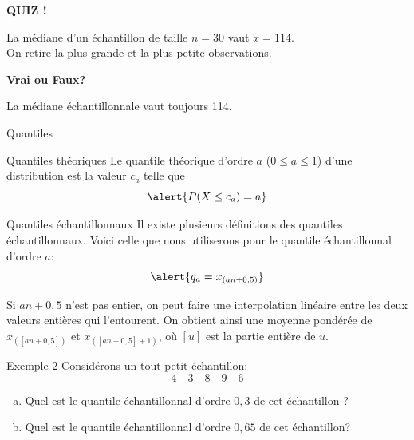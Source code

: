 \documentclass{BeamerTemplate}
\begin{document}
\begin{frame}[t]{ }

\centerline{\LARGE\bf \alert{QUIZ !}}
\bigskip

La médiane d'un échantillon de taille $n=30$ vaut $\widetilde x =114$. \\
On retire la plus grande et la plus petite observations.
\bigskip

{\bf Vrai ou Faux?}
\bigskip

La médiane échantillonnale vaut toujours 114.
\vspace{2cm}

\end{frame}
\begin{frame}[t]{Quantiles}
\vspace{-0.6cm}
\begin{Boite}{Quantiles théoriques}
Le quantile théorique d'ordre $a$ ($0\leq a\leq 1$) d'une distribution est la valeur $c_a$ telle que
$$\alert{P(X\le c_a)=a}$$
\end{Boite}

\begin{Boite}{Quantiles échantillonnaux}
Il existe plusieurs définitions des quantiles échantillonnaux. Voici celle que nous utiliserons pour le  quantile échantillonnal d'ordre $a$:
$$\alert{q_a=x_{(an+0,5)}}$$
\end{Boite}

\alert{Si $an+0,5$ n'est pas entier}, on peut faire une interpolation linéaire entre les deux valeurs entières qui l'entourent. On obtient ainsi une moyenne pondérée de $x_{([an+0,5])}$ et $x_{([an+0,5]+1)}$, o\`u $[u]$ est la partie entière de $u$.

\end{frame}
\begin{frame}[t]{Exemple 2}
Considérons un tout petit échantillon:
$$4\quad 3\quad 8\quad 9\quad 6$$

\begin{enumerate}[a)]
\item Quel est le quantile échantillonnal d'ordre $0,3$ de cet échantillon ?
\vspace{1.5cm}


\item  Quel est le quantile échantillonnal d'ordre $0,65$ de cet échantillon?
\end{enumerate}
\vspace{2cm}

\end{frame}
\end{document}
